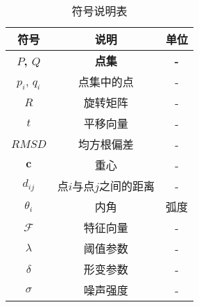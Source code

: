 \begin{table}[H]
\centering
\caption{符号说明表}
\begin{tabularx}{\textwidth}{CCC}
\toprule %
\textbf{符号}    & \textbf{说明}    & \textbf{单位} \\
\midrule %
\textbf{$P$, $Q$} & \textbf{点集} & \textbf{-} \\
$p_i$, $q_i$ & 点集中的点 & - \\
$R$ & 旋转矩阵 & - \\
$t$ & 平移向量 & - \\
$RMSD$ & 均方根偏差 & - \\
$\mathbf{c}$ & 重心 & - \\
$d_{ij}$ & 点$i$与点$j$之间的距离 & - \\
$\theta_i$ & 内角 & 弧度 \\
$\mathcal{F}$ & 特征向量 & - \\
$\lambda$ & 阈值参数 & - \\
$\delta$ & 形变参数 & - \\
$\sigma$ & 噪声强度 & - \\
\bottomrule %
\end{tabularx}
\label{tab:符号说明}
\end{table}

\endgroup %